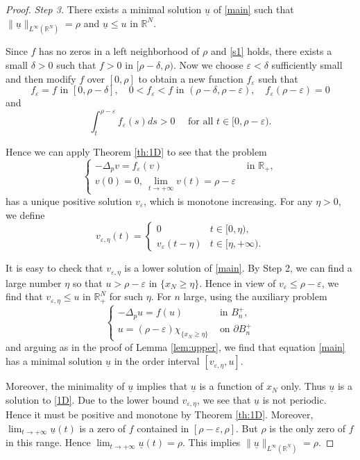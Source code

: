 \documentclass[10pt,a4paper]{amsart}
\begin{document}
\begin{proof}
		\textit{Step 3.} There exists a minimal solution $\underline u$ of \eqref{main} such that $\|\underline u\|_{L^\infty(\mathbb{R}^N)}=\rho$ and $\underline u \le u$ in $\mathbb{R}^N$.
		
		Since $f$ has no zeros in a left neighborhood of $\rho$ and \eqref{s1} holds, there exists a small $\delta > 0$ such that $f > 0$ in $[\rho - \delta, \rho)$. Now we choose $\varepsilon<\delta$ sufficiently small and then modify $f$ over $[0, \rho]$ to obtain a new function $f_\varepsilon$ such that
		\[
		f_\varepsilon = f \text{ in } [0, \rho-\delta],\quad
		0<f_\varepsilon<f \text{ in } (\rho-\delta,\rho-\varepsilon),\quad
		f_\varepsilon(\rho-\varepsilon)=0
		\]
		and
		\[
		\int_{t}^{\rho-\varepsilon} f_\varepsilon(s) ds > 0 \quad\text{ for all } t\in[0, \rho-\varepsilon).
		\]
		
		Hence we can apply Theorem \ref{th:1D} to see that the problem
		\[
		\begin{cases}
			-\Delta_p v = f_\varepsilon(v) & \text{ in } \mathbb{R}_+,\\
			v(0)=0,~ \lim_{t\to+\infty} v(t) = \rho-\varepsilon
		\end{cases}
		\]
		has a unique positive solution $v_\varepsilon$, which is monotone increasing. For any $\eta>0$, we define
		\[
		v_{\varepsilon,\eta}(t) =
		\begin{cases}
			0 & t \in [0,\eta),\\
			v_\varepsilon(t-\eta) & t \in [\eta,+\infty).
		\end{cases}
		\]
		
		It is easy to check that $v_{\varepsilon,\eta}$ is a lower solution of \eqref{main}. By Step 2, we can find a large number $\eta$ so that $u>\rho-\varepsilon$ in $\{x_N\ge \eta\}$. Hence in view of $v_\varepsilon\le \rho-\varepsilon$, we find that $v_{\varepsilon,\eta}\le u$ in $\mathbb{R}^N_+$ for such $\eta$. For $n$ large, using the auxiliary problem
		\[
		\begin{cases}
			-\Delta_p u = f(u) &\text{ in } B_n^+,\\
			u = (\rho-\varepsilon)\chi_{\{x_N\ge\eta\}} &\text{ on } \partial B_n^+
		\end{cases}
		\]
		and arguing as in the proof of Lemma \ref{lem:upper}, we find that equation \eqref{main} has a minimal solution $\underline u$ in the order interval $[v_{\varepsilon,\eta}, u]$.
		
		Moreover, the minimality of $\underline u$ implies that $\underline u$ is a function of $x_N$ only. Thus $\underline u$ is a solution to \eqref{1D}. Due to the lower bound $v_{\varepsilon,\eta}$, we see that $\underline u$ is not periodic. Hence it must be positive and monotone by Theorem \ref{th:1D}. Moreover, $\lim_{t\to+\infty} \underline u(t)$ is a zero of $f$ contained in $[\rho-\varepsilon,\rho]$. But $\rho$ is the only zero of $f$ in this range. Hence $\lim_{t\to+\infty} \underline u(t)=\rho$. This implies $\|\underline u\|_{L^\infty(\mathbb{R}^N)}=\rho$.
	\end{proof}
\end{document}
